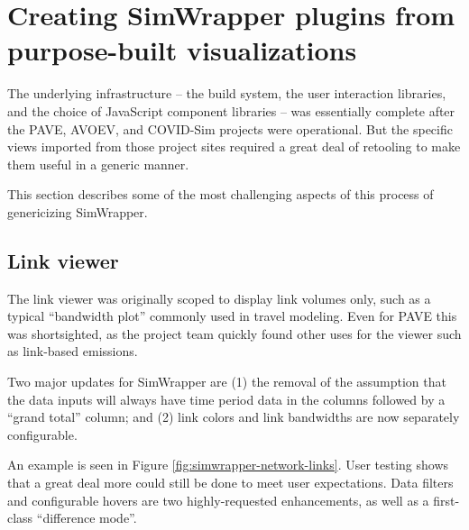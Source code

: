 \hypertarget{simwrapper-converting-purpose-built-visualizations-into-generic-data-viewers}{%
\section{Creating SimWrapper plugins from purpose-built visualizations}
\label{simwrapper-converting-purpose-built-visualizations-into-generic-data-viewers}}

The underlying infrastructure -- the build system, the user interaction libraries, and the choice of JavaScript component libraries -- was essentially complete after the PAVE, AVOEV, and COVID-Sim projects were operational. But the specific views imported from those project sites required a great deal of retooling to make them useful in a generic manner.

This section describes some of the most challenging aspects of this process of genericizing SimWrapper.


\hypertarget{simwrapper-link-viewer}{%
\subsection{Link viewer}\label{simwrapper-link-viewer}}

The link viewer was originally scoped to display link volumes only, such as a typical ``bandwidth plot'' commonly used in travel modeling. Even for PAVE this was shortsighted, as the project team quickly found other uses for the viewer such as link-based emissions.

Two major updates for SimWrapper are (1) the removal of the assumption that the data inputs will always have time period data in the columns followed by a ``grand total'' column; and (2) link colors and link bandwidths are now separately configurable.

An example is seen in Figure \ref{fig:simwrapper-network-links}. User testing shows that a great deal more could still be done to meet user expectations. Data filters and configurable hovers are two highly-requested enhancements, as well as a first-class ``difference mode''.

